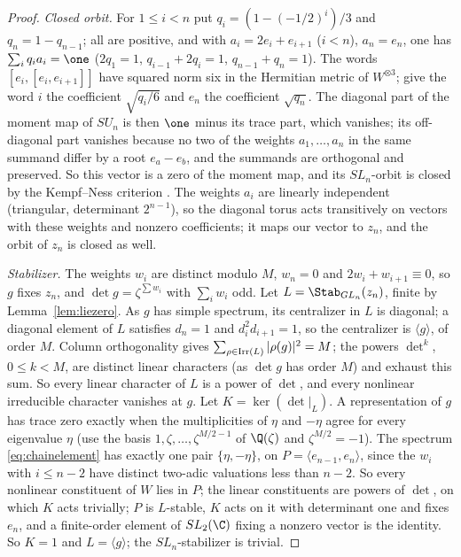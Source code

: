 \begin{proof}
\emph{Closed orbit.} For $1\le i<n$ put $q_i=(1-(-1/2)^i)/3$ and $q_n=1-q_{n-1}$;
all are positive, and with $a_i=2e_i+e_{i+1}$ ($i<n$), $a_n=e_n$, one has
$\sum_iq_ia_i=\one$ ($2q_1=1$, $q_{i-1}+2q_i=1$, $q_{n-1}+q_n=1$). The words
$[e_i,[e_i,e_{i+1}]]$ have squared norm six in the Hermitian metric of
$W^{\otimes3}$; give the word $i$ the coefficient $\sqrt{q_i/6}$ and $e_n$ the
coefficient $\sqrt{q_n}$. The diagonal part of the moment map of $SU_n$ is then
$\one$ minus its trace part, which vanishes; its off-diagonal part vanishes
because no two of the weights $a_1,\dots,a_n$ in the same summand differ by a
root $e_a-e_b$, and the summands are orthogonal and preserved. So this vector
is a zero of the moment map, and its $SL_n$-orbit is closed by the
Kempf--Ness criterion \cite[Theorem 4, p.~1]{Losev}. The weights $a_i$ are
linearly independent (triangular, determinant $2^{n-1}$), so the diagonal torus
acts transitively on vectors with these weights and nonzero coefficients; it
maps our vector to $z_n$, and the orbit of $z_n$ is closed as well.

\emph{Stabilizer.} The weights $w_i$ are distinct modulo $M$, $w_n=0$ and
$2w_i+w_{i+1}\equiv0$, so $g$ fixes $z_n$, and $\det g=\zeta^{\sum w_i}$ with
$\sum_iw_i$ odd. Let $L=\Stab_{GL_n}(z_n)$, finite by Lemma~\ref{lem:liezero}.
As $g$ has simple spectrum, its centralizer in $L$ is diagonal; a diagonal
element of $L$ satisfies $d_n=1$ and $d_i^2d_{i+1}=1$, so the centralizer is
$\langle g\rangle$, of order $M$. Column orthogonality gives
$\sum_{\rho\in{\rm Irr}(L)}|\rho(g)|^2=M$; the powers $\det^k$, $0\le k<M$, are
distinct linear characters (as $\det g$ has order $M$) and exhaust this sum. So
every linear character of $L$ is a power of $\det$, and every nonlinear
irreducible character vanishes at $g$. Let $K=\ker(\det|_L)$. A representation
of $g$ has trace zero exactly when the multiplicities of $\eta$ and $-\eta$
agree for every eigenvalue $\eta$ (use the basis $1,\zeta,\dots,\zeta^{M/2-1}$
of $\Q(\zeta)$ and $\zeta^{M/2}=-1$). The spectrum \eqref{eq:chainelement} has
exactly one pair $\{\eta,-\eta\}$, on $P=\langle e_{n-1},e_n\rangle$, since
the $w_i$ with $i\le n-2$ have distinct two-adic valuations less than $n-2$.
So every nonlinear constituent of $W$ lies in $P$; the linear constituents are
powers of $\det$, on which $K$ acts trivially; $P$ is $L$-stable, $K$ acts on
it with determinant one and fixes $e_n$, and a finite-order element of
$SL_2(\C)$ fixing a nonzero vector is the identity. So $K=1$ and
$L=\langle g\rangle$; the $SL_n$-stabilizer is trivial.


\end{proof}
